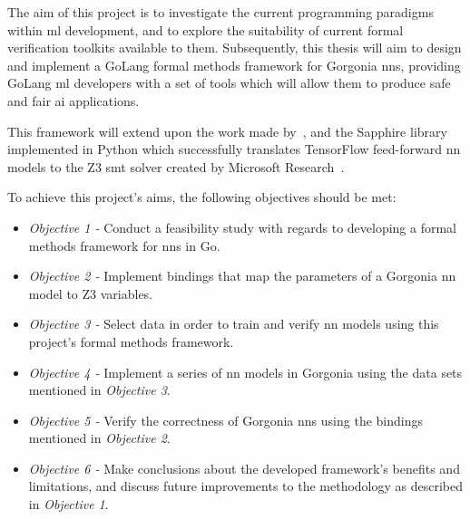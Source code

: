 The aim of this project is to investigate the current programming paradigms within \gls{ml} development,
and to explore the suitability of current formal verification toolkits available to them. Subsequently,
this thesis will aim to design and implement a GoLang formal methods framework for Gorgonia \glspl{nn},
providing GoLang \gls{ml} developers with a set of tools which will allow them to produce safe and
fair \gls{ai} applications.

This framework will extend upon the work made by~\citep{kokke2020}, and the Sapphire library implemented in Python
which successfully translates TensorFlow feed-forward \gls{nn} models to the Z3 \Gls{smt} solver created by Microsoft Research~\citep{demoura2008}.



To achieve this project's aims, the following objectives should be met:

\begin{itemize}
    \setlength\itemsep{0em}
    \item \textit{Objective 1 -} Conduct a feasibility study with regards to developing a formal methods framework for \glspl{nn} in Go.
    \item \textit{Objective 2 -} Implement bindings that map the parameters of a Gorgonia \gls{nn} model to
        Z3 variables.
    \item \textit{Objective 3 -} Select data in order to train and verify \gls{nn} models using this project's formal methods framework.
    \item \textit{Objective 4 -} Implement a series of \gls{nn} models in Gorgonia using the data sets mentioned in \textit{Objective 3}.
    \item \textit{Objective 5 -} Verify the correctness of Gorgonia \glspl{nn} using the bindings mentioned in \textit{Objective 2}.
    \item \textit{Objective 6 -} Make conclusions about the developed framework's benefits and limitations, and discuss future improvements to the methodology as described in \textit{Objective 1}.
\end{itemize}
